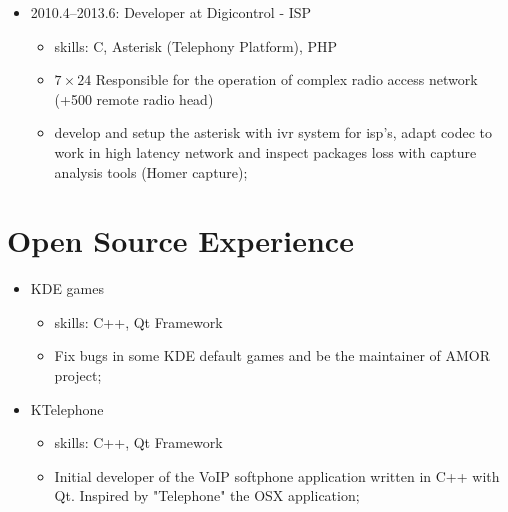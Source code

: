 \documentclass[
]{article}
\providecommand{\tightlist}{%
  \setlength{\itemsep}{0pt}\setlength{\parskip}{0pt}}
\begin{document}
\vspace{2mm}

\begin{itemize}
\tightlist
\item
  2010.4--2013.6: Developer at Digicontrol - ISP

  \begin{itemize}
  \tightlist
  \item
    skills: C, Asterisk (Telephony Platform), PHP
  \item
    \(7 \times 24\) Responsible for the operation of complex radio
    access network (+500 remote radio head)
  \item
    develop and setup the asterisk with ivr system for isp's, adapt
    codec to work in high latency network and inspect packages loss with
    capture analysis tools (Homer capture);
  \end{itemize}
\end{itemize}

\hypertarget{open-source-experience}{%
\section{Open Source Experience}\label{open-source-experience}}

\begin{itemize}
\tightlist
\item
  KDE games

  \begin{itemize}
  \tightlist
  \item
    skills: C++, Qt Framework
  \item
    Fix bugs in some KDE default games and be the maintainer of AMOR
    project;
  \end{itemize}
\end{itemize}

\vspace{2mm}

\begin{itemize}
\tightlist
\item
  KTelephone

  \begin{itemize}
  \tightlist
  \item
    skills: C++, Qt Framework
  \item
    Initial developer of the VoIP softphone application written in C++
    with Qt. Inspired by "Telephone" the OSX application;
  \end{itemize}
\end{itemize}
\end{document}
